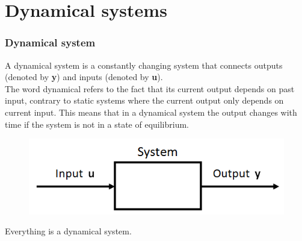 \documentclass{beamer}
\begin{document}
%
%
%
%
%
%
%



\section{Dynamical systems} 

\begin{frame}
\frametitle{Dynamical system}
A dynamical system is a constantly changing system that connects outputs (denoted by \textbf y) and inputs (denoted by \textbf u).\\The word dynamical refers to the fact that its current output depends on past input, contrary to static systems where the current output only depends on current input. This means that in a dynamical system the output changes with time if the system is not in a state of equilibrium.
\begin{figure}
\includegraphics[width=0.8\linewidth]{Dynamical_system}
\end{figure}
\medskip
Everything is a dynamical system.
\end{frame}
\end{document}
